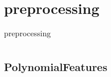\chapter{preprocessing}
\begin{table}
    \centering
    \caption{preprocessing}
    \begin{tabular}{l}
        \hline
        \nameref{PolynomialFeatures} \\
        \hline
    \end{tabular}
\end{table}
\section{PolynomialFeatures\label{PolynomialFeatures}}
